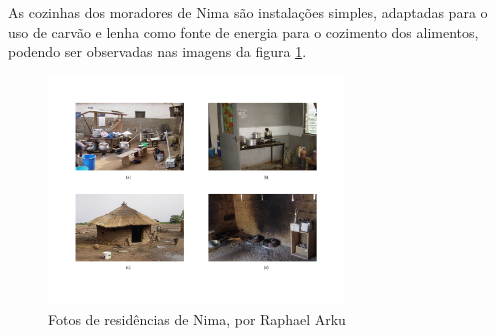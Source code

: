 

As cozinhas dos moradores de Nima são instalações simples, adaptadas para o uso
de carvão e lenha como fonte de energia para o cozimento dos alimentos, 
podendo ser observadas nas imagens da figura \ref{fig:nima}.

\begin{figure}[H]
  \centering
    \includegraphics[width=0.7\textwidth]{../inputs/images/zheng/nima.pdf}
    \caption{Fotos de residências de Nima, por Raphael Arku \label{fig:nima}}
\end{figure}
